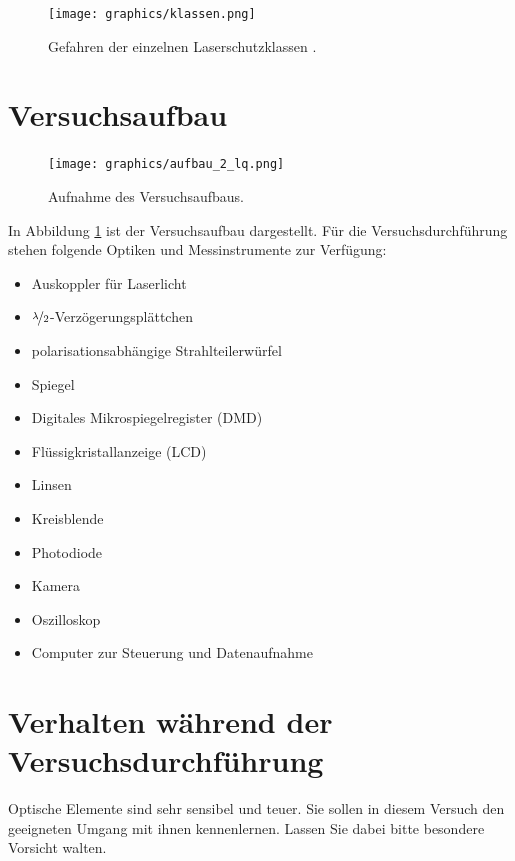 \documentclass[
class=book,
accentcolor=1b,
custommargins=geometry,
fontsize=11pt,
thesis={type=Versuchsanleitung},
ruledheaders=all,
headline=false,
instbox=false,
marginpar=false,
title=small,
ignore-missing-data=true,
twoside=false,
pdfa=false %
]{apqpub}
\begin{document}
\begin{figure}[H]
\centering
	\texttt{[image: graphics/klassen.png]}
\caption{Gefahren der einzelnen Laserschutzklassen \protect\cite{klassen}.}
\end{figure}

	\section{Versuchsaufbau}
\begin{figure}[H]
\centering
	\texttt{[image: graphics/aufbau\_2\_lq.png]}
\caption{Aufnahme des Versuchsaufbaus.}
\label{fig:aufbau}
\end{figure}

In Abbildung \ref{fig:aufbau} ist der Versuchsaufbau dargestellt.
Für die Versuchsdurchführung stehen folgende Optiken und Messinstrumente zur Verfügung:
\begin{itemize}
\item Auskoppler für Laserlicht
\item $\nicefrac{\lambda}{2}$-Verzögerungsplättchen
\item polarisationsabhängige Strahlteilerwürfel
\item Spiegel
\item Digitales Mikrospiegelregister (DMD)
\item Flüssigkristallanzeige (LCD)
\item Linsen
\item Kreisblende
\item Photodiode
\item Kamera
\item Oszilloskop \cite{manual:Oszi}
\item Computer zur Steuerung und Datenaufnahme
\end{itemize}
	\section{Verhalten während der Versuchsdurchführung}
	Optische Elemente sind sehr sensibel und teuer.
	Sie sollen in diesem Versuch den geeigneten Umgang mit ihnen kennenlernen. 
	Lassen Sie dabei bitte besondere Vorsicht walten.
\end{document}
